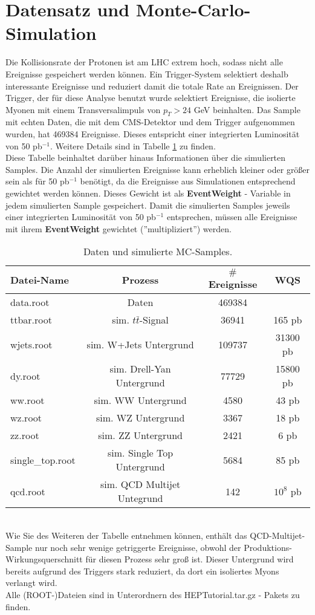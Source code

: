 \section{Datensatz und Monte-Carlo-Simulation}
\label{datasets}
Die Kollisionsrate der Protonen ist am LHC extrem hoch, sodass nicht alle Ereignisse gespeichert werden k\"onnen. Ein Trigger-System selektiert deshalb interessante Ereignisse und reduziert damit die totale Rate an Ereignissen. Der Trigger, der f\"ur diese Analyse benutzt wurde selektiert Ereignisse, die isolierte Myonen mit einem Transversalimpuls von $p_{T}>24$ GeV beinhalten. Das Sample mit echten Daten, die mit dem CMS-Detektor und dem Trigger aufgenommen wurden, hat 469384 Ereignisse. Dieses entspricht einer integrierten Luminosit\"at von 50 pb$^{-1}$. Weitere Details sind in Tabelle \ref{table_samples} zu finden.\\
Diese Tabelle beinhaltet dar\"uber hinaus Informationen \"uber die simulierten Samples. Die Anzahl der simulierten Ereignisse kann erheblich kleiner oder gr\"o\ss{}er sein als f\"ur 50 pb$^{-1}$ ben\"otigt, da die Ereignisse aus Simulationen entsprechend gewichtet werden k\"onnen. Dieses Gewicht ist als \textbf{EventWeight} - Variable in jedem simulierten Sample gespeichert. Damit die simulierten Samples jeweils einer integrierten Luminosit\"at von 50 pb$^{-1}$ entsprechen, m\"ussen alle Ereignisse mit ihrem \textbf{EventWeight} gewichtet (''multipliziert'') werden.
\begin{small}
\begin{table}[h!]
  \centering
  \begin{tabular}{|l|c|c|c|}
    \hline 
Datei-Name & Prozess & $\#$Ereignisse & WQS \\ \hline\hline
data.root & Daten & 469384 & \\ \hline
ttbar.root & sim. $t\bar{t}$-Signal & 36941 & 165 pb  \\
wjets.root & sim. W+Jets Untergrund & 109737 & 31300 pb \\
dy.root & sim. Drell-Yan Untergrund & 77729 & 15800 pb \\
ww.root & sim. WW Untergrund & 4580 & 43 pb \\
wz.root & sim. WZ Untergrund & 3367 & 18 pb \\
zz.root & sim. ZZ Untergrund & 2421 & 6 pb \\
single\_top.root & sim. Single Top Untergrund & 5684 & 85 pb \\
qcd.root & sim. QCD Multijet Untegrund & 142 & $10^8$ pb \\
    \hline
  \end{tabular}
  \caption{Daten und simulierte MC-Samples.}
  \label{table_samples}
\end{table}
\end{small}
\\Wie Sie des Weiteren der Tabelle entnehmen k\"onnen, enth\"alt das QCD-Multijet-Sample nur noch sehr wenige getriggerte Ereignisse, obwohl der Produktions-Wirkungsquerschnitt f\"ur diesen Prozess sehr gro\ss{} ist. Dieser Untergrund wird bereits aufgrund des Triggers stark reduziert, da dort ein isoliertes Myons verlangt wird.\\
Alle (ROOT-)Dateien sind in Unterordnern des HEPTutorial.tar.gz - Pakets zu finden.